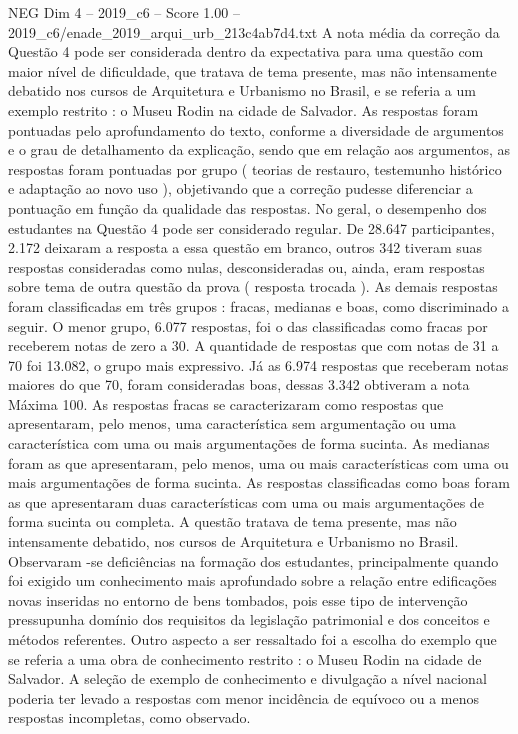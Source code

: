 \begin{textsample}{NEG Dim 4 – 2019\_c6 – Score 1.00 – 2019\_c6/enade\_2019\_arqui\_urb\_213c4ab7d4.txt}
A nota média da correção da Questão 4 pode ser considerada dentro da expectativa para uma questão com maior nível de dificuldade, que tratava de tema presente, mas não intensamente debatido nos cursos de Arquitetura e Urbanismo no Brasil, e se referia a um exemplo restrito : o Museu Rodin na cidade de Salvador.
As respostas foram pontuadas pelo aprofundamento do texto, conforme a diversidade de argumentos e o grau de detalhamento da explicação, sendo que em relação aos argumentos, as respostas foram pontuadas por grupo ( teorias de restauro, testemunho histórico e adaptação ao novo uso ), objetivando que a correção pudesse diferenciar a pontuação em função da qualidade das respostas.
No geral, o desempenho dos estudantes na Questão 4 pode ser considerado regular.
De 28.647 participantes, 2.172 deixaram a resposta a essa questão em branco, outros 342 tiveram suas respostas consideradas como nulas, desconsideradas ou, ainda, eram respostas sobre tema de outra questão da prova ( resposta trocada ).
As demais respostas foram classificadas em três grupos : fracas, medianas e boas, como discriminado a seguir.
O menor grupo, 6.077 respostas, foi o das classificadas como fracas por receberem notas de zero a 30.
A quantidade de respostas que com notas de 31 a 70 foi 13.082, o grupo mais expressivo.
Já as 6.974 respostas que receberam notas maiores do que 70, foram consideradas boas, dessas 3.342 obtiveram a nota Máxima 100.
As respostas fracas se caracterizaram como respostas que apresentaram, pelo menos, uma característica sem argumentação ou uma característica com uma ou mais argumentações de forma sucinta.
As medianas foram as que apresentaram, pelo menos, uma ou mais características com uma ou mais argumentações de forma sucinta.
As respostas classificadas como boas foram as que apresentaram duas características com uma ou mais argumentações de forma sucinta ou completa.
A questão tratava de tema presente, mas não intensamente debatido, nos cursos de Arquitetura e Urbanismo no Brasil.
Observaram -se deficiências na formação dos estudantes, principalmente quando foi exigido um conhecimento mais aprofundado sobre a relação entre edificações novas inseridas no entorno de bens tombados, pois esse tipo de intervenção pressupunha domínio dos requisitos da legislação patrimonial e dos conceitos e métodos referentes.
Outro aspecto a ser ressaltado foi a escolha do exemplo que se referia a uma obra de conhecimento restrito : o Museu Rodin na cidade de Salvador.
A seleção de exemplo de conhecimento e divulgação a nível nacional poderia ter levado a respostas com menor incidência de equívoco ou a menos respostas incompletas, como observado.

\end{textsample}

